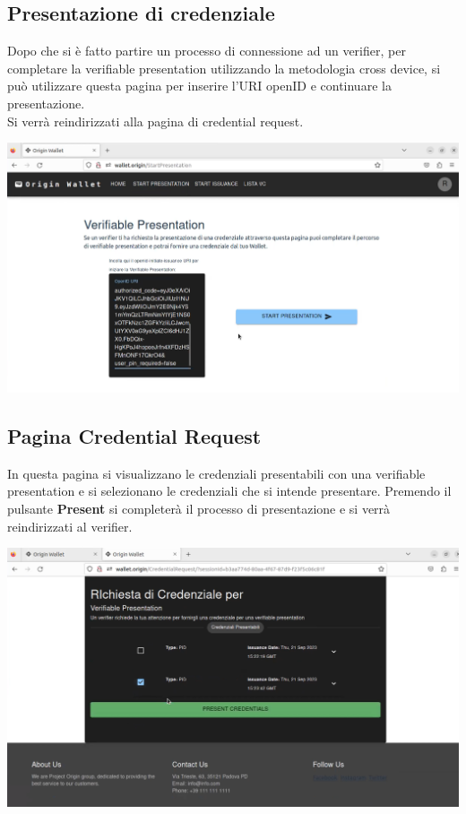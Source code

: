\subsection{Presentazione di credenziale}
Dopo che si è fatto partire un processo di connessione ad un verifier, per completare la verifiable presentation utilizzando la metodologia cross device, si può utilizzare questa pagina per inserire l'URI openID e continuare la presentazione.\\
Si verrà reindirizzati alla pagina di credential request.
\begin{center}
\includegraphics[scale = 0.2]{./res/img/wallet/new/wallet_presentation.png}
\end{center}
\subsection{Pagina Credential Request}
In questa pagina si visualizzano le credenziali presentabili con una verifiable presentation e si selezionano le credenziali che si intende presentare. Premendo il pulsante \textbf{Present} si completerà il processo di presentazione e si verrà reindirizzati al verifier.
\begin{center}
\includegraphics[scale = 0.2]{./res/img/wallet/new/wallet_present.png}
\end{center}
